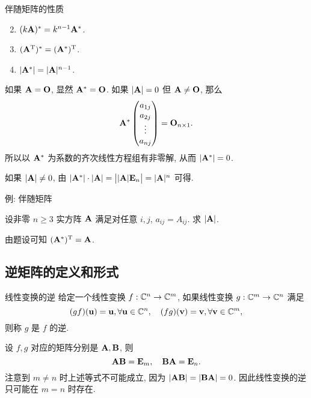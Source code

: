 \begin{frame}{伴随矩阵的性质}
	\onslide<+->
	\begin{block@}
		\begin{enumerate}
			\setcounter{enumi}{1}
			\item $(k{\mathbf{A}})^*=k^{n-1}{\mathbf{A}}^*$.
			\item $({\mathbf{A}}^{\mathrm{T}})^*=({\mathbf{A}}^*)^{\mathrm{T}}$.
			\item $|{\mathbf{A}}^*|=|{\mathbf{A}}|^{n-1}$.
		\end{enumerate}
	\end{block@}
	\onslide<+->
	如果 ${\mathbf{A}}={\mathbf{O}}$, 显然 ${\mathbf{A}}^*={\mathbf{O}}$.
	\onslide<+->
	如果 $|\bfA|=0$ 但 ${\mathbf{A}}\neq {\mathbf{O}}$, 那么
	\[{\mathbf{A}}^*\begin{pmatrix}
		a_{1j}\\a_{2j}\\\vdots\\a_{nj}
	\end{pmatrix}={\mathbf{O}}_{n\times 1}.\]
	\onslide<+->
	所以以 ${\mathbf{A}}^*$ 为系数的齐次线性方程组有非零解, 从而 $|{\mathbf{A}}^*|=0$.

	\onslide<+->
	如果 $|{\mathbf{A}}|\neq0$, 由 $|{\mathbf{A}}^*|\cdot|{\mathbf{A}}|=\bigl||{\mathbf{A}}|{\mathbf{E}}_n\bigr|=|{\mathbf{A}}|^n$ 可得.
\end{frame}


\begin{frame}{例: 伴随矩阵}
	\onslide<+->
	\begin{example}
		设非零 $n\ge 3$ 实方阵 ${\mathbf{A}}$ 满足对任意 $i,j$, $a_{ij}=A_{ij}$. 求 $|{\mathbf{A}}|$.
	\end{example}
	\onslide<+->
	\begin{solution}
		由题设可知 $({\mathbf{A}}^*)^{\mathrm{T}}={\mathbf{A}}$.
		\onslide<+->{%
		从而 $|\bfA|=0$ 或 $1$.
		}
		
	\end{solution}
\end{frame}


\subsection{逆矩阵的定义和形式}
\begin{frame}{线性变换的逆}
	\onslide<+->
	给定一个线性变换 $f:{\mathbb{C}}^n\rightarrow{\mathbb{C}}^m$, 如果线性变换 $g:{\mathbb{C}}^m\to{\mathbb{C}}^n$ 满足
	\[(gf)({\mathbf{u}})={\mathbf{u}},\forall {\mathbf{u}}\in{\mathbb{C}}^n,\quad
	(fg)({\mathbf{v}})={\mathbf{v}},\forall {\mathbf{v}}\in{\mathbb{C}}^m,\]
	\onslide<+->
	则称 $g$ 是 $f$ 的逆.

	\onslide<+->
	设 $f,g$ 对应的矩阵分别是 ${\mathbf{A}},{\mathbf{B}}$, 则
	\[{\mathbf{A}}{\mathbf{B}}={\mathbf{E}}_m,\quad {\mathbf{B}}{\mathbf{A}}={\mathbf{E}}_n.\]
	\onslide<+->
	注意到 $m\neq n$ 时上述等式不可能成立, 因为 $|{\mathbf{A}}{\mathbf{B}}|=|{\mathbf{B}}{\mathbf{A}}|=0$.
	\onslide<+->
	因此线性变换的逆只可能在 $m=n$ 时存在.
\end{frame}


